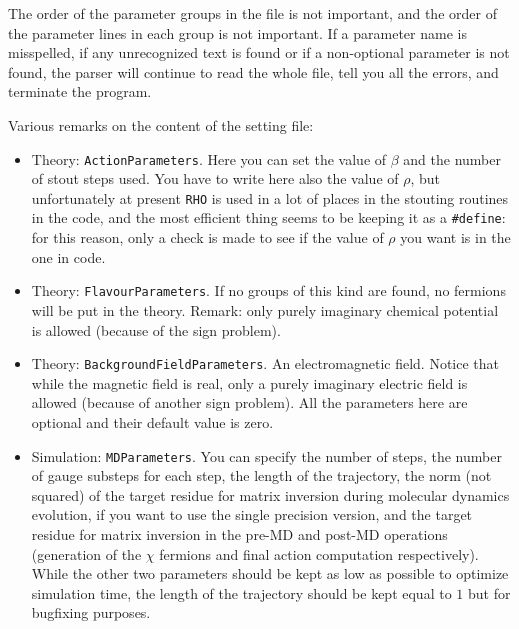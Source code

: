 The order of the parameter groups in the file is not important, and the order 
of the parameter lines in each group is not important. If a parameter name is 
misspelled, if any unrecognized text is found or if a non-optional parameter 
is not found, the parser will continue to read the whole file, tell you all 
the errors, and terminate the program.

Various remarks on the content of the setting file:

\begin{itemize}
    \item{Theory: \verb|ActionParameters|.}
        Here you can set the value of $\beta$ and the number of stout steps used. You 
        have to write here also the value of $\rho$, but unfortunately at present 
        \verb|RHO| is used in a lot of places in the stouting routines in the code, and 
        the most efficient thing seems to be keeping it as a \verb|#define|: for this 
        reason, only a check is made to see if the value of $\rho$ you want is in 
        the one in code.
    \item{Theory: \verb|FlavourParameters|.}
        If no groups of this kind are found, no fermions will be put in the theory.
        Remark: only purely imaginary chemical potential is allowed (because of the 
        sign problem). 
    \item{Theory: \verb|BackgroundFieldParameters|.}
        An electromagnetic field. Notice that while the magnetic field is real, only 
        a purely imaginary electric field is allowed (because of another sign 
problem). All the parameters here are optional and their default value is zero.
    \item{Simulation: \verb|MDParameters|.} You can specify the number of steps, 
        the number of gauge substeps for each step, the length of the 
        trajectory, the norm (not squared) of the target residue for matrix 
        inversion during molecular dynamics evolution, if you want to use 
        the single precision version, and the target residue for matrix 
inversion in the pre-MD and post-MD operations (generation of the $\chi$ 
fermions and final action computation respectively). While the other two 
parameters should be kept as 
        low as possible to optimize simulation time, the length of the trajectory 
        should be kept equal to $1$ but for bugfixing purposes.


\end{itemize}
